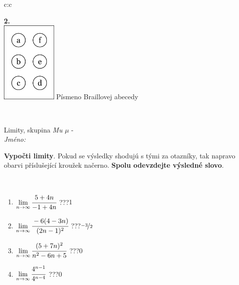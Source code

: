 \documentclass[10pt]{report}
\begin{document}
\begin{tabular}{c:c}
\begin{minipage}[c][104.5mm][t]{0.5\linewidth}
\begin{center}
\begin{minipage}{0.20\linewidth}
\begin{center}
{\Huge\bfseries 2.} \\[2mm]
\includegraphics[height=40mm]{../images/braille.png}
{\small Písmeno Braillovej abecedy}
\end{center}
\end{minipage}
\end{center}
\end{minipage}
\\ \hdashline
\begin{minipage}[c][104.5mm][t]{0.5\linewidth}
\begin{center}
\vspace{7mm}
{\huge Limity, skupina \textit{Mu $\mu$} -}\\[5mm]
\textit{Jméno:}\phantom{xxxxxxxxxxxxxxxxxxxxxxxxxxxxxxxxxxxxxxxxxxxxxxxxxxxxxxxxxxxxxxxxx}\\[5mm]
\begin{minipage}{0.95\linewidth}
\begin{center}
\textbf{Vypočti limity}. Pokud se výsledky shodujú s tými za otazníky, tak napravo\\obarvi příslušející kroužek načerno. \textbf{Spolu odevzdejte výsledné slovo}.
\end{center}
\end{minipage}
\\[1mm]
\begin{minipage}{0.79\linewidth}
\begin{center}
\begin{varwidth}{\linewidth}
\begin{enumerate}
\normalsize
\item $\lim\limits_{n\to\infty}\cfrac{5+4n}{-1+4n}$\quad \dotfill\; ???\;\dotfill \quad $1$
\item $\lim\limits_{n\to\infty}\cfrac{-6(4-3n)}{(2n-1)^2}$\quad \dotfill\; ???\;\dotfill \quad $\nicefrac{-3}{2}$
\item $\lim\limits_{n\to\infty}\cfrac{(5+7n)^2}{n^2-6n+5}$\quad \dotfill\; ???\;\dotfill \quad $0$
\item $\lim\limits_{n\to\infty}\cfrac{4^{n-1}}{4^{n-4}}$\quad \dotfill\; ???\;\dotfill \quad $0$

\end{enumerate}
\end{varwidth}
\end{center}
\end{minipage}
\end{center}
\end{minipage}
\end{tabular}
\end{document}

